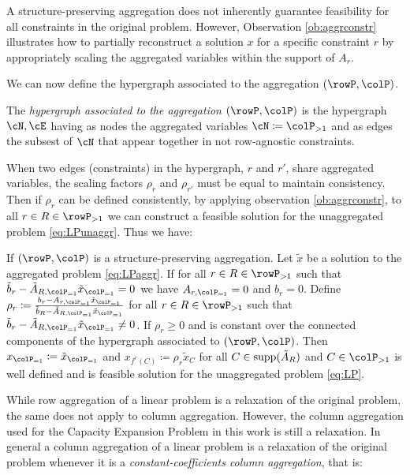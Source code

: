 {A structure-preserving aggregation does not inherently guarantee feasibility for all constraints in the original problem. However, Observation \ref{ob:aggrconstr} illustrates how to partially reconstruct a solution \(x\) for a specific constraint \(r\) by appropriately scaling the aggregated variables within the support of \(A_r\). 

We can now define the hypergraph associated to the aggregation \((\rowP, \colP)\).
\begin{definition}
  The \emph{hypergraph associated to the aggregation \((\rowP, \colP)\)} is the hypergraph \(\cN, \cE\) having as nodes the aggregated variables \(\cN \coloneqq \colP_{>1}\) and as edges the subsest of \(\cN\) that appear together in not row-agnostic constraints.
\end{definition}

When two edges (constraints) in the hypergraph, \(r\) and \(r'\), share aggregated variables, the scaling factors \(\rho_r\) and \(\rho_{r'}\) must be equal to maintain consistency. 
Then if \(\rho_r\) can be defined consistently, by applying observation \ref{ob:aggrconstr}, to all \(r \in R \in \rowP_{>1}\) we can construct a feasible solution for the unaggregated problem \eqref{eq:LPunaggr}. Thus we have: 
\begin{proposition}
\label{prop:xaggfeasible}
If \((\rowP, \colP)\) is a structure-preserving aggregation. Let \(\tilde{x}\) be a solution 
to the aggregated problem \eqref{eq:LPaggr}. If for all \(r \in R \in \rowP_{>1}\) such that  \(\tilde{b}_r - \tilde{A}_{R, \colP_{=1}} \tilde{x}_{\colP_{=1}} = 0\) we have \(A_{r,\colP_{=1}} = 0\) and \(b_r=0\).
Define \(\rho_r \coloneqq \frac{b_r - A_{r, \colP_{=1}} \tilde{x}_{\colP_{=1}}}{\tilde{b}_R - \tilde{A}_{R, \colP_{=1}} \tilde{x}_{\colP_{=1}}}\) for all \(r \in R \in \rowP_{>1}\) such that   \(\tilde{b}_r - \tilde{A}_{R, \colP_{=1}} \tilde{x}_{\colP_{=1}} \neq 0\). If \(\rho_r \geq 0\) and is constant over the connected components of the hypergraph associated to \((\rowP, \colP)\). 
Then \(x_{\colP_{=1}} \coloneqq \tilde{x}_{\colP_{=1}}\) and \(x_{f^r(C)} \coloneqq \rho_r \tilde{x}_C\) for all \(C \in \operatorname{supp}(\tilde{A}_R)\) and \(C \in \colP_{>1}\) is well defined and is feasible solution for the unaggregated problem \eqref{eq:LP}.
\end{proposition}


While row aggregation of a linear problem is a relaxation of the original problem, the same does not apply to column aggregation. However, the column aggregation used for the  Capacity Expansion Problem in this work is still a relaxation. In general a column aggregation of a linear problem is a relaxation of the original problem whenever it is a \emph{constant-coefficients column aggregation}, that is:


}
